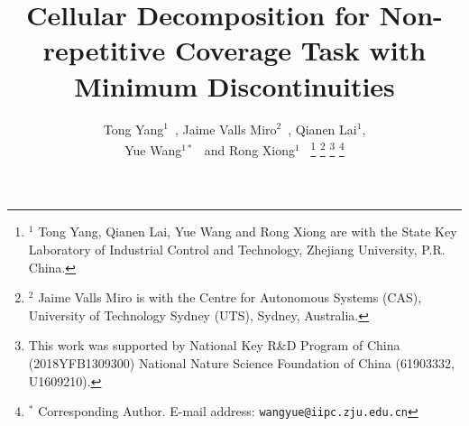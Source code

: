 \documentclass[journal]{IEEEtran}
\begin{document}
%
\title{Cellular Decomposition for Non-repetitive Coverage Task with Minimum Discontinuities}
%
%
%


\author{Tong Yang$^1$~, Jaime Valls Miro$^2$~, Qianen Lai$^1$,\\ Yue Wang$^{1*}$~ and Rong Xiong$^1$~
\thanks{$^1$ Tong Yang, Qianen Lai, Yue Wang and Rong Xiong are with the State Key 
Laboratory of Industrial Control and Technology, Zhejiang University, P.R. China. 
}
\thanks{$^2$ Jaime Valls Miro is with the Centre for Autonomous Systems (CAS), University of Technology Sydney (UTS), Sydney, Australia.}
\thanks{This work was supported by National Key R\&D Program of China (2018YFB1309300) National Nature Science Foundation of China (61903332, U1609210).}
\thanks{$^*$ Corresponding Author. \newline \indent
E-mail address: {\tt\small wangyue@iipc.zju.edu.cn}}
}
\end{document}
